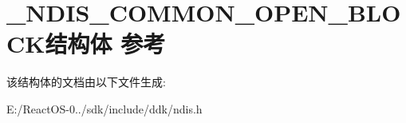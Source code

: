 \hypertarget{struct___n_d_i_s___c_o_m_m_o_n___o_p_e_n___b_l_o_c_k}{}\section{\+\_\+\+N\+D\+I\+S\+\_\+\+C\+O\+M\+M\+O\+N\+\_\+\+O\+P\+E\+N\+\_\+\+B\+L\+O\+C\+K结构体 参考}
\label{struct___n_d_i_s___c_o_m_m_o_n___o_p_e_n___b_l_o_c_k}


该结构体的文档由以下文件生成\+:\begin{DoxyCompactItemize}
\item 
E\+:/\+React\+O\+S-\/0../sdk/include/ddk/ndis.\+h\end{DoxyCompactItemize}
